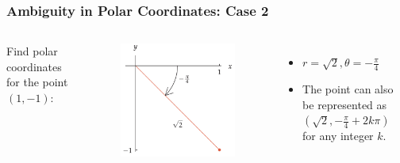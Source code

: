 \documentclass{beamer}
\begin{document}
\begin{frame}
\frametitle{Ambiguity in Polar Coordinates: Case 2}
\begin{columns}
    Find polar coordinates for the point \((1, -1)\):
        \begin{figure}
        \centering
        \includegraphics[width=\textwidth]{polar4.png}
        \end{figure}
    \begin{itemize}
        \item \(r = \sqrt{2}, \theta = -\frac{\pi}{4}\)
        \item The point can also be represented as \( (\sqrt{2}, -\frac{\pi}{4} + 2k\pi) \) for any integer \( k \).
    \end{itemize}
\end{columns}
\end{frame} 
\end{document}
